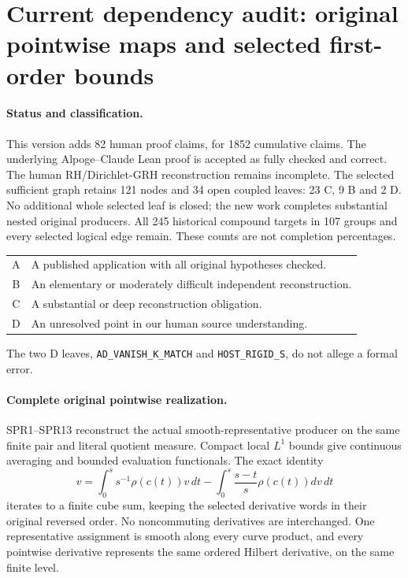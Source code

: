 \section{Current dependency audit: original pointwise maps and selected first-order bounds}
\label{sec:dependency-audit-v37}

\paragraph{Status and classification.}
This version adds 82 human proof claims, for 1852 cumulative claims. The underlying Alpoge–Claude Lean proof is accepted as fully checked and correct. The human RH/Dirichlet-GRH reconstruction remains incomplete.
The selected sufficient graph retains 121 nodes and 34 open coupled
leaves: 23 C, 9 B and 2 D. No additional whole selected leaf is closed;
the new work completes substantial nested original producers.
All 245 historical compound targets in 107 groups and every selected
logical edge remain. These counts are not completion percentages.

\begin{center}\small
\begin{tabular}{cp{}}
A & A published application with all original hypotheses checked.\\
B & An elementary or moderately difficult independent reconstruction.\\
C & A substantial or deep reconstruction obligation.\\
D & An unresolved point in our human source understanding.\\
\end{tabular}
\end{center}
The two D leaves, \texttt{AD\_VANISH\_K\_MATCH} and
\texttt{HOST\_RIGID\_S}, do not allege a formal error.

\paragraph{Complete original pointwise realization.}
SPR1--SPR13 reconstruct the actual smooth-representative producer
on the same finite pair and literal quotient measure. Compact local
$L^1$ bounds give continuous averaging and bounded evaluation
functionals. The exact identity
\[
 v=\int_0^s s^{-1}\rho(c(t))v\,dt
       -\int_0^s\frac{s-t}{s}\rho(c(t))dv\,dt
\]
iterates to a finite cube sum, keeping the selected derivative words
in their original reversed order. No noncommuting derivatives are
interchanged. One representative assignment is smooth along every
curve product, and every pointwise derivative represents the same
ordered Hilbert derivative, on the same finite level.

